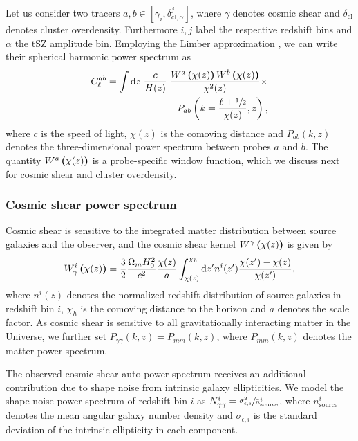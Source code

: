 \documentclass[%
 reprint,
nofootinbib,
 amsmath,amssymb,
 aps,
]{revtex4-1}
\begin{document}
Let us consider two tracers $a, b \in [\gamma_{i}, \delta_{\mathrm{cl}, \alpha}^{j}]$, where $\gamma$ denotes cosmic shear and $\delta_{\mathrm{cl}}$ denotes cluster overdensity. Furthermore $i, j$ label the respective redshift bins and $\alpha$ the tSZ amplitude bin. Employing the Limber approximation \cite{Limber:1953, Kaiser:1992, Kaiser:1998}, we can write their spherical harmonic power spectrum as
\begin{equation}
\begin{aligned}
C_{\ell}^{ab}=\int \mathrm{d} z \; \frac{c}{H(z)} \; \frac{W^{a}\boldsymbol{\left(}\chi(z)\boldsymbol{\right)}W^{b}\boldsymbol{\left(}\chi(z)\boldsymbol{\right)}}{\chi^{2}(z)} \times \\
P_{ab}\left(k=\frac{\ell+\sfrac{1}{2}}{\chi(z)}, z\right),
\end{aligned}
\end{equation}
where $c$ is the speed of light, $\chi(z)$ is the comoving distance and $P_{ab}(k, z)$ denotes the three-dimensional power spectrum between probes $a$ and $b$. The quantity $W^{a}\boldsymbol{\left(}\chi(z)\boldsymbol{\right)}$ is a probe-specific window function, which we discuss next for cosmic shear and cluster overdensity.

\subsubsection{Cosmic shear power spectrum}

Cosmic shear is sensitive to the integrated matter distribution between source galaxies and the observer, and the cosmic shear kernel $W^{\gamma}\boldsymbol{\left(}\chi(z)\boldsymbol{\right)}$ is given by
\begin{equation}
W^{i}_{\gamma}\boldsymbol{\left(}\chi(z)\boldsymbol{\right)} = \frac{3}{2} \frac{\Omega_{m} H^{2}_{0}}{c^{2}} \frac{\chi(z)}{a} \int_{\chi(z)}^{\chi_{h}} \mathrm{d} z' n^{i}(z') \frac{\chi(z')-\chi(z)}{\chi(z')},
\label{eq:gammawindow}
\end{equation}
where $n^{i}(z)$ denotes the normalized redshift distribution of source galaxies in redshift bin $i$, $\chi_{h}$ is the comoving distance to the horizon and $a$ denotes the scale factor. As cosmic shear is sensitive to all gravitationally interacting matter in the Universe, we further set $P_{\gamma \gamma}(k, z) = P_{mm}(k, z)$, where $P_{mm}(k, z)$ denotes the matter power spectrum.

The observed cosmic shear auto-power spectrum receives an additional contribution due to shape noise from intrinsic galaxy ellipticities. We model the shape noise power spectrum of redshift bin $i$ as $N^{i}_{\gamma \gamma} = \sfrac{\sigma_{\epsilon, i}^{2}}{\bar{n}^{i}_{\mathrm{source}}}$, where $\bar{n}^{i}_{\mathrm{source}}$ denotes the mean angular galaxy number density and $\sigma_{\epsilon, i}$ is the standard deviation of the intrinsic ellipticity in each component.
\end{document}

